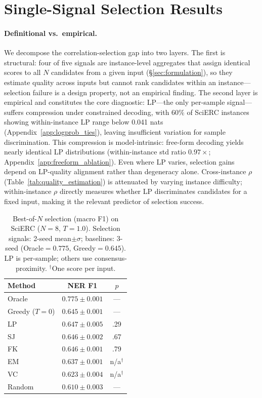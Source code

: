 \section{Single-Signal Selection Results}\label{sec:selection_gap}

\paragraph{Definitional vs.\ empirical.}
We decompose the correlation-selection gap into two layers.
The first is structural: four of five signals are instance-level aggregates that assign identical scores to all $N$ candidates from a given input (\S\ref{sec:formulation}), so they estimate quality across inputs but cannot rank candidates within an instance---selection failure is a design property, not an empirical finding.
The second layer is empirical and constitutes the core diagnostic: LP---the only per-sample signal---suffers compression under constrained decoding, with 60\% of SciERC instances showing within-instance LP range below 0.041 nats (Appendix~\ref{app:logprob_ties}), leaving insufficient variation for sample discrimination. This compression is model-intrinsic: free-form decoding yields nearly identical LP distributions (within-instance std ratio $0.97{\times}$; Appendix~\ref{app:freeform_ablation}). Even where LP varies, selection gains depend on LP-quality alignment rather than degeneracy alone.
Cross-instance $\rho$ (Table~\ref{tab:quality_estimation}) is attenuated by varying instance difficulty; within-instance $\rho$ directly measures whether LP discriminates candidates for a fixed input, making it the relevant predictor of selection success.

\begin{table}[t]
\centering
\small
\caption{Best-of-$N$ selection (macro F1) on SciERC ($N{=}8$, $T{=}1.0$). Selection signals: 2-seed mean${\pm}\sigma$; baselines: 3-seed (Oracle${=}0.775$, Greedy${=}0.645$). LP is per-sample; others use consensus-proximity. $^\dagger$One score per input.}
\label{tab:selection}
\begin{tabular}{lcc}
\toprule
Method & NER F1 & $p$ \\
\midrule
Oracle & $0.775 \pm 0.001$ & --- \\
Greedy ($T{=}0$) & $0.645 \pm 0.001$ & --- \\
\midrule
LP           & $\mathbf{0.647} \pm 0.005$ & .29 \\
SJ           & $0.646 \pm 0.002$ & .67 \\
FK           & $0.646 \pm 0.001$ & .79 \\
EM           & $0.637 \pm 0.001$ & n/a$^\dagger$ \\
VC           & $0.623 \pm 0.004$ & n/a$^\dagger$ \\
\midrule
Random       & $0.610 \pm 0.003$ & --- \\
\bottomrule
\end{tabular}
\end{table}

